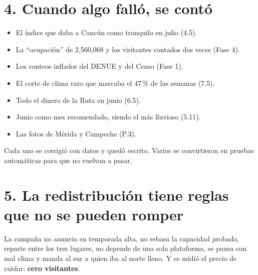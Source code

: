 \section{4. Cuando algo falló, se contó}
\begin{itemize}
\item El índice que daba a Cancún como tranquilo en julio (4.5).
\item La ``ocupación'' de 2,560,068 y los visitantes contados dos veces (Fase 4).
\item Los conteos inflados del DENUE y del Censo (Fase 1).
\item El corte de clima raro que marcaba el 47\,\% de las semanas (7.5).
\item Todo el dinero de la Ruta en junio (6.5).
\item Junio como mes recomendado, siendo el más lluvioso (5.11).
\item Las fotos de Mérida y Campeche (P.3).
\end{itemize}
Cada uno se corrigió con datos y quedó escrito. Varios se convirtieron en pruebas automáticas para que no vuelvan a pasar.

\section{5. La redistribución tiene reglas que no se pueden romper}
La campaña no anuncia en temporada alta, no rebasa la capacidad probada, reparte entre los tres lugares, no depende de una
sola plataforma, se pausa con mal clima y manda al sur a quien iba al norte lleno. Y se midió el precio de cuidar: \textbf{cero
visitantes}.
